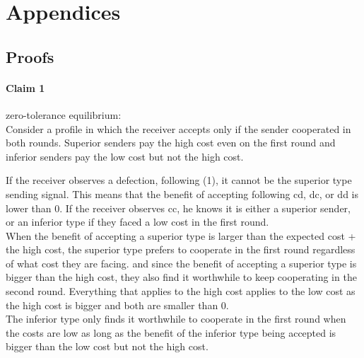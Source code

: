 \documentclass[11pt]{article}
\theoremstyle{plainCl1}
\begin{document}
\section{Appendices}

\subsection{Proofs}

\paragraph{Claim 1} zero-tolerance equilibrium:\\

Consider a profile in which the receiver accepts only if the sender cooperated in both rounds. 
Superior senders pay the high cost even on the first round and inferior senders pay the low cost but not the high cost. 


If the receiver observes a defection, following (1), it cannot be the superior type sending signal. 
This means that the benefit of accepting following cd, dc, or dd is lower than 0.
If the receiver observes cc, he knows it is either a superior sender, or an inferior type if they faced a low cost in the first round. \\

When the benefit of accepting a superior type is larger than the expected cost + the high cost, 
the superior type prefers to cooperate in the first round regardless of what cost they are facing. 
and since the benefit of accepting a superior type is bigger than the high cost, they also find it worthwhile to keep cooperating in the second round. 
Everything that applies to the high cost applies to the low cost as the high cost is bigger and both are smaller than 0. \\

The inferior type only finds it worthwhile to cooperate in the first round when the costs are low 
as long as the benefit of the inferior type being accepted is bigger than the low cost but not the high cost. \\
\end{document}

